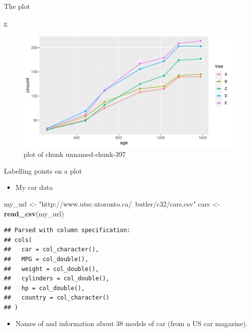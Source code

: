 \documentclass[ignorenonframetext,]{beamer}
\newenvironment{Shaded}{\begin{snugshade}}{\end{snugshade}}
\newcommand{\KeywordTok}[1]{\textcolor[rgb]{0.13,0.29,0.53}{\textbf{#1}}}
\newcommand{\NormalTok}[1]{#1}
\newcommand{\StringTok}[1]{\textcolor[rgb]{0.31,0.60,0.02}{#1}}
\providecommand{\tightlist}{%
  \setlength{\itemsep}{0pt}\setlength{\parskip}{0pt}}
\begin{document}
\begin{frame}[fragile]{The plot}
\protect\hypertarget{the-plot-4}{}

\begin{Shaded}
\begin{Highlighting}[]
\NormalTok{g}
\end{Highlighting}
\end{Shaded}

\begin{figure}
\centering
\includegraphics{figure/unnamed-chunk-397-1.pdf}
\caption{plot of chunk unnamed-chunk-397}
\end{figure}

\end{frame}

\begin{frame}[fragile]{Labelling points on a plot}
\protect\hypertarget{labelling-points-on-a-plot}{}

\begin{itemize}
\tightlist
\item
  My car data
\end{itemize}

\begin{Shaded}
\begin{Highlighting}[]
\NormalTok{my_url <-}\StringTok{ "http://www.utsc.utoronto.ca/~butler/c32/cars.csv"}
\NormalTok{cars <-}\StringTok{ }\KeywordTok{read_csv}\NormalTok{(my_url)}
\end{Highlighting}
\end{Shaded}

\begin{verbatim}
## Parsed with column specification:
## cols(
##   car = col_character(),
##   MPG = col_double(),
##   weight = col_double(),
##   cylinders = col_double(),
##   hp = col_double(),
##   country = col_character()
## )
\end{verbatim}

\begin{itemize}
\tightlist
\item
  Names of and information about 38 models of car (from a US car
  magazine).
\end{itemize}

\end{frame}
\end{document}
